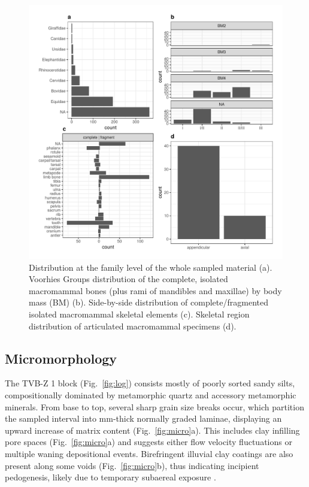 \documentclass[review,times,authoryear]{elsarticle} %
\begin{document}
\begin{figure}
  \centering
  \includegraphics[width=1\textwidth]{./artwork/Fig:fauna_.pdf}
  \caption{Distribution at the family level of the whole sampled material (a). Voorhies Groups distribution of the complete, isolated macromammal bones (plus rami of mandibles and maxillae) by body mass (BM) (b). Side-by-side distribution of complete/fragmented isolated macromammal skeletal elements (c). Skeletal region distribution of articulated macromammal specimens (d).}
  \label{fig:fauna}
\end{figure}


\subsection{Micromorphology}

The TVB-Z 1 block (Fig.~\ref{fig:log}) consists mostly of poorly sorted sandy silts, compositionally dominated by metamorphic quartz and accessory metamorphic minerals. From base to top, several sharp grain size breaks occur, which partition the sampled interval into mm-thick normally graded laminae, displaying an upward increase of matrix content (Fig.~\ref{fig:micro}a). This includes clay infilling pore spaces (Fig.~\ref{fig:micro}a) and suggests either flow velocity fluctuations or multiple waning depositional events. Birefringent illuvial clay coatings are also present along some voids (Fig.~\ref{fig:micro}b), thus indicating incipient pedogenesis, likely due to temporary subaereal exposure \citep{Kuehn2010}.
\end{document}
